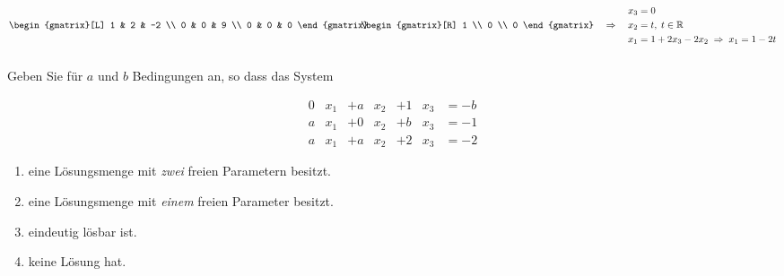 \begin{solution}
    \begin{equation*}
        \begin{gmatrix}[L]
            1 & 2 & -2 \\
            0 & 0 & 9 \\
            0 & 0 & 0
        \end{gmatrix} \hspace{-0.75em}
        \begin{gmatrix}[R]
            1 \\ 0 \\ 0
        \end{gmatrix} \quad \Rightarrow \quad
        \begin{aligned}
            x_3 &= 0 \\
            x_2 &= t, \; t \in \mathbb{R} \\
            x_1 &= 1 + 2x_3 - 2x_2 \; \Rightarrow \; x_1 = 1 - 2t
        \end{aligned}
    \end{equation*}

\end{solution}

\newpage

\subsubsection{} %

Geben Sie für \( a \) und \( b \) Bedingungen an, so dass das System

\begin{equation*}
    \begin{aligned}
        0 &x_1 &+ a &x_2 &+ 1 &x_3 &= -b\\
        a &x_1 &+ 0 &x_2 &+ b &x_3 &= -1\\
        a &x_1 &+ a &x_2 &+ 2 &x_3 &= -2
    \end{aligned}
\end{equation*}

\begin{enumerate}[label=\alph*)]
    \item eine Lösungsmenge mit \textit{zwei} freien Parametern besitzt.
    \item eine Lösungsmenge mit \textit{einem} freien Parameter besitzt.
    \item eindeutig lösbar ist.
    \item keine Lösung hat.
\end{enumerate}

